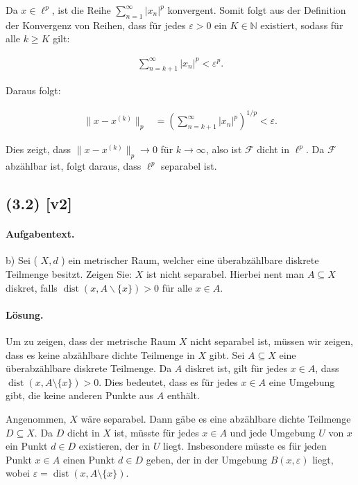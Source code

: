 \documentclass[11pt,a4paper]{article}
\begin{document}
Da $x \in \ell^p$, ist die Reihe $\sum_{n=1}^{\infty} |x_n|^p$ konvergent. Somit folgt aus der Definition der Konvergenz von Reihen, dass für jedes $\varepsilon > 0$ ein $K \in \mathbb{N}$ existiert, sodass für alle $k \geq K$ gilt:

\begin{align*}
\sum_{n=k+1}^{\infty} |x_n|^p < \varepsilon^p.
\end{align*}

Daraus folgt:

\begin{align*}
\|x - x^{(k)}\|_p &= \left( \sum_{n=k+1}^{\infty} |x_n|^p \right)^{1/p} < \varepsilon.
\end{align*}

Dies zeigt, dass $\|x - x^{(k)}\|_p \to 0$ für $k \to \infty$, also ist $\mathcal{F}$ dicht in $\ell^p$. Da $\mathcal{F}$ abzählbar ist, folgt daraus, dass $\ell^p$ separabel ist.


\subsection*{(3.2) [v2]}
\paragraph{Aufgabentext.}
b) Sei ( $X, d$ ) ein metrischer Raum, welcher eine überabzählbare diskrete Teilmenge besitzt. Zeigen Sie: $X$ ist nicht separabel.
Hierbei nent man $A \subseteq X$ diskret, falls $\operatorname{dist}(x, A \backslash\{x\})>0$ für alle $x \in A$.

\paragraph{Lösung.}
Um zu zeigen, dass der metrische Raum \(X\) nicht separabel ist, müssen wir zeigen, dass es keine abzählbare dichte Teilmenge in \(X\) gibt. Sei \(A \subseteq X\) eine überabzählbare diskrete Teilmenge. Da \(A\) diskret ist, gilt für jedes \(x \in A\), dass \(\operatorname{dist}(x, A \setminus \{x\}) > 0\). Dies bedeutet, dass es für jedes \(x \in A\) eine Umgebung gibt, die keine anderen Punkte aus \(A\) enthält.

Angenommen, \(X\) wäre separabel. Dann gäbe es eine abzählbare dichte Teilmenge \(D \subseteq X\). Da \(D\) dicht in \(X\) ist, müsste für jedes \(x \in A\) und jede Umgebung \(U\) von \(x\) ein Punkt \(d \in D\) existieren, der in \(U\) liegt. Insbesondere müsste es für jeden Punkt \(x \in A\) einen Punkt \(d \in D\) geben, der in der Umgebung \(B(x, \varepsilon)\) liegt, wobei \(\varepsilon = \operatorname{dist}(x, A \setminus \{x\})\).
\end{document}
